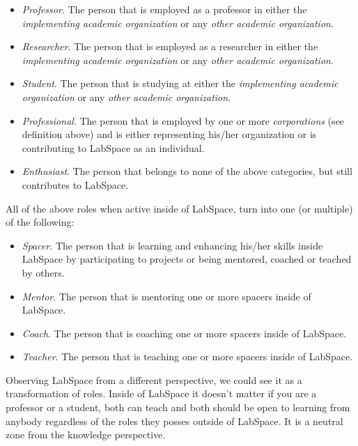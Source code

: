 \documentclass[a4paper, 11pt]{article}
\begin{document}
\begin{itemize}[noitemsep]
    \item \textit{Professor}. The person that is employed as a professor in either the \textit{implementing academic organization} or any \textit{other academic organization}.
    \item \textit{Researcher}. The person that is employed as a researcher in either the \textit{implementing academic organization} or any \textit{other academic organization}.
    \item \textit{Student}. The person that is studying at either the \textit{implementing academic organization} or any \textit{other academic organization}.
    \item \textit{Professional}. The person that is employed by one or more \textit{corporations} (see definition above) and is either representing his/her organization or is contributing to LabSpace as an individual.
    \item \textit{Enthusiast}. The person that belongs to none of the above categories, but still contributes to LabSpace.
\end{itemize}

All of the above roles when active inside of LabSpace, turn into one (or multiple) of the following:

\begin{itemize}[noitemsep]
    \item \textit{Spacer}. The person that is learning and enhancing his/her skills inside LabSpace by participating to projects or being mentored, coached or teached by others.
    \item \textit{Mentor}. The person that is mentoring one or more spacers inside of LabSpace.
    \item \textit{Coach}. The person that is coaching one or more spacers inside of LabSpace.
    \item \textit{Teacher}. The person that is teaching one or more spacers inside of LabSpace.
\end{itemize}

Observing LabSpace from a different perspective, we could see it as a transformation of roles. Inside of LabSpace it doesn't matter if you are a professor or a student, both can teach and both should be open to learning from anybody regardless of the roles they posses outside of LabSpace. It is a neutral zone from the knowledge perspective.


\end{document}
